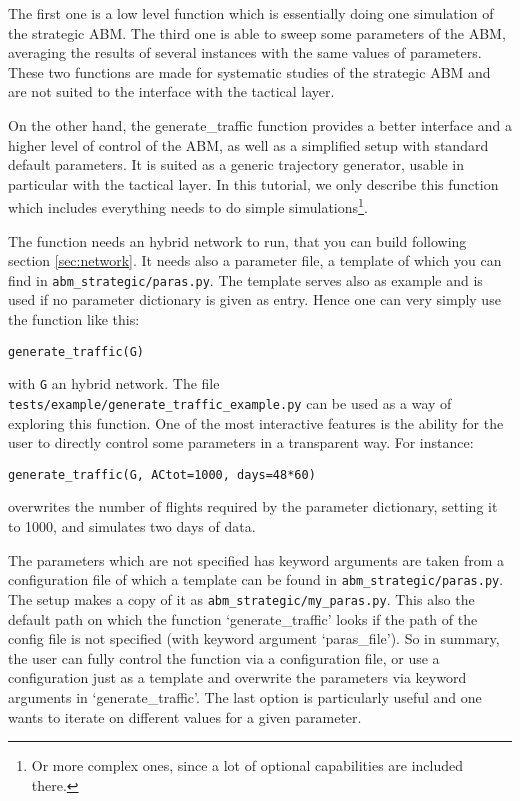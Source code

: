 \documentclass[12pt]{article}
\begin{document}
The first one is a low level function which is essentially doing one simulation of the strategic ABM. The third one is able to sweep some parameters of the ABM, averaging the results of several instances with the same values of parameters. These two functions are made for systematic studies of the strategic ABM and are not suited to the interface with the tactical layer.

On the other hand, the generate\_traffic function provides a better interface and a higher level of control of the ABM, as well as a simplified setup with standard default parameters. It is suited as a generic trajectory generator, usable in particular with the tactical layer. In this tutorial, we only describe this function which includes everything needs to do simple simulations\footnote{Or more complex ones, since a lot of optional capabilities are included there.}.

The function needs an hybrid network to run, that you can build following section \ref{sec:network}. It needs also a parameter file, a template of which you can find in \verb|abm_strategic/paras.py|. The template serves also as example and is used if no parameter dictionary is given as entry. Hence one can very simply use the function like this:
\begin{verbatim}
generate_traffic(G)
\end{verbatim}
with \verb|G| an hybrid network. The file \verb|tests/example/generate_traffic_example.py| can be used as a way of exploring this function. One of the most interactive features is the ability for the user to directly control some parameters in a transparent way. For instance:
\begin{verbatim}
generate_traffic(G, ACtot=1000, days=48*60)
\end{verbatim}
overwrites the number of flights required by the parameter dictionary, setting it to 1000, and simulates two days of data.

The parameters which are not specified has keyword arguments are taken from a configuration file of which a template can be found in \verb|abm_strategic/paras.py|. The setup makes a copy of it as \verb|abm_strategic/my_paras.py|. This also the default path on which the function `generate\_traffic' looks if the path of the config file is not specified (with keyword argument `paras\_file'). So in summary, the user can fully control the function via a configuration file, or use a configuration just as a template and overwrite the parameters via keyword arguments in `generate\_traffic'. The last option is particularly useful and one wants to iterate on different values for a given parameter.
\end{document}
